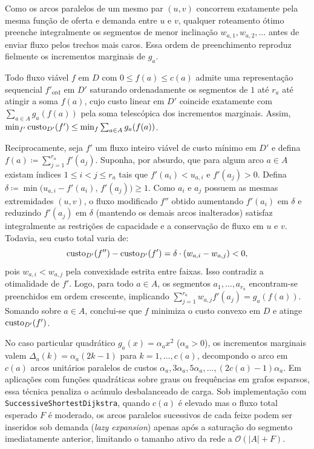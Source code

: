  Como os arcos paralelos de um mesmo par $(u, v)$ concorrem exatamente pela mesma função de oferta e demanda entre $u$ e $v$, qualquer roteamento ótimo preenche integralmente os segmentos de menor inclinação $w_{a,1}, w_{a,2}, \dots$ antes de enviar fluxo pelos trechos mais caros. Essa ordem de preenchimento reproduz fielmente os incrementos marginais de $g_a$.

\begin{demonstracao}
Todo fluxo viável $f$ em $D$ com $0 \le f(a) \le c(a)$ admite uma representação sequencial $f'_{\text{ord}}$ em $D'$ saturando ordenadamente os segmentos de $1$ até $r_a$ até atingir a soma $f(a)$, cujo custo linear em $D'$ coincide exatamente com $\sum_{a \in A} g_a(f(a))$ pela soma telescópica dos incrementos marginais. Assim, $\min_{f'} \operatorname{custo}_{D'}(f') \le \min_f \sum_{a \in A} g_a(f(a))$.

Reciprocamente, seja $f'$ um fluxo inteiro viável de custo mínimo em $D'$ e defina $f(a) \coloneqq \sum_{j=1}^{r_a} f'(a_j)$. Suponha, por absurdo, que para algum arco $a \in A$ existam índices $1 \le i < j \le r_a$ tais que $f'(a_i) < u_{a,i}$ e $f'(a_j) > 0$. Defina $\delta \coloneqq \min\bigl(u_{a,i} - f'(a_i),\, f'(a_j)\bigr) \ge 1$. Como $a_i$ e $a_j$ possuem as mesmas extremidades $(u, v)$, o fluxo modificado $f''$ obtido aumentando $f'(a_i)$ em $\delta$ e reduzindo $f'(a_j)$ em $\delta$ (mantendo os demais arcos inalterados) satisfaz integralmente as restrições de capacidade e a conservação de fluxo em $u$ e $v$. Todavia, seu custo total varia de:
\begin{equation*}
    \operatorname{custo}_{D'}(f'') - \operatorname{custo}_{D'}(f') = \delta \cdot (w_{a,i} - w_{a,j}) < 0,
\end{equation*}
pois $w_{a,i} < w_{a,j}$ pela convexidade estrita entre faixas. Isso contradiz a otimalidade de $f'$. Logo, para todo $a \in A$, os segmentos $a_1, \dots, a_{r_a}$ encontram-se preenchidos em ordem crescente, implicando $\sum_{j=1}^{r_a} w_{a,j} f'(a_j) = g_a(f(a))$. Somando sobre $a \in A$, conclui-se que $f$ minimiza o custo convexo em $D$ e atinge $\operatorname{custo}_{D'}(f')$.
\end{demonstracao}

 No caso particular quadrático $g_a(x) = \alpha_a x^2$ ($\alpha_a > 0$), os incrementos marginais valem $\Delta_a(k) = \alpha_a(2k - 1)$ para $k = 1, \dots, c(a)$, decompondo o arco em $c(a)$ arcos unitários paralelos de custos $\alpha_a, 3\alpha_a, 5\alpha_a, \dots, (2c(a) - 1)\alpha_a$. Em aplicações com funções quadráticas sobre graus ou frequências em grafos esparsos, essa técnica penaliza o acúmulo desbalanceado de carga. Sob implementação com \lstinline{SuccessiveShortestDijkstra}, quando $c(a)$ é elevado mas o fluxo total esperado $F$ é moderado, os arcos paralelos sucessivos de cada feixe podem ser inseridos sob demanda (\textit{lazy expansion}) apenas após a saturação do segmento imediatamente anterior, limitando o tamanho ativo da rede a $\mathcal{O}(|A| + F)$.
